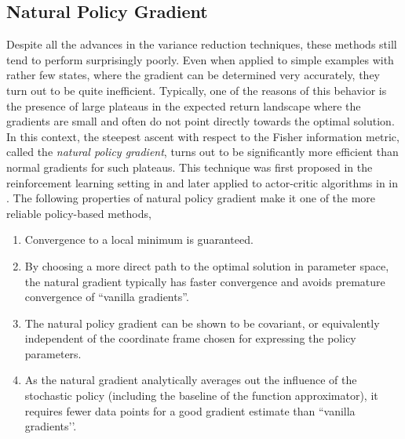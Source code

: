 \subsection{Natural Policy Gradient}
Despite all the advances in the variance reduction techniques, these methods still tend to perform surprisingly poorly. Even when applied to simple examples with rather few states, where the gradient can be determined very accurately, they turn out to be quite inefficient. Typically, one of the reasons of this behavior is the presence of large plateaus in the expected return landscape where the gradients are small and often do not point directly towards the optimal solution. In this context, the steepest ascent with respect to the Fisher information metric, called the \emph{natural policy gradient}, turns out to be significantly more efficient than normal gradients for such
plateaus. This technique was first proposed in the reinforcement learning setting in \cite{kakade2001natural} and later applied to actor-critic algorithms in in \cite{peters2008reinforcement}. The following properties of natural policy gradient make it one of the more reliable policy-based methods,
\begin{enumerate}[label={\roman*)}]
	\item Convergence to a local minimum is guaranteed.
	\item By choosing a more direct path to the optimal solution in parameter space, the natural gradient typically has faster convergence and avoids premature convergence of ``vanilla gradients''.
	\item  The natural policy gradient can be shown to be covariant, or equivalently independent of the coordinate frame chosen for expressing the policy parameters.
	\item As the natural gradient analytically averages out the influence of the stochastic policy (including the baseline of the function approximator), it requires fewer data points for a good gradient estimate than ``vanilla gradients’'.
\end{enumerate}

